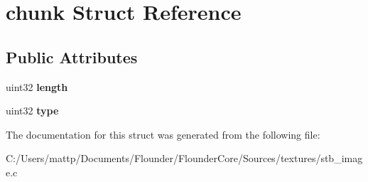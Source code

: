 \hypertarget{structchunk}{}\section{chunk Struct Reference}
\label{structchunk}
\subsection*{Public Attributes}
\begin{DoxyCompactItemize}
\item 
\mbox{\label{structchunk_a0b5cc0c5a9b91945c42373db2a499fb1}} 
uint32 {\bfseries length}
\item 
\mbox{\label{structchunk_a05d5489f3807bc7ba149c1904241d087}} 
uint32 {\bfseries type}
\end{DoxyCompactItemize}


The documentation for this struct was generated from the following file\+:\begin{DoxyCompactItemize}
\item 
C\+:/\+Users/mattp/\+Documents/\+Flounder/\+Flounder\+Core/\+Sources/textures/stb\+\_\+image.\+c\end{DoxyCompactItemize}
